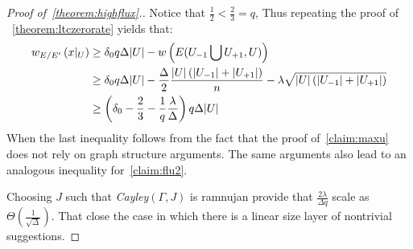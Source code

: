 \begin{proof}[Proof of~\cref{theorem:highflux}.] 
  Notice that $\frac{1}{2} < \frac{2}{3} = q$, Thus repeating the proof of ~\cref{theorem:ltczerorate} yields that:
  \begin{equation*}
    \begin{split}
      w_{E/E^{\prime}}  \left( x|_{U} \right)  & \ge  \delta_{0}q\Delta|U|  - w\left( E(U_{-1} \bigcup U_{+1} ,U) \right)  \\ 
      & \ge   \delta_{0}q\Delta|U| - \frac{\Delta}{2} \frac{|U|\left( |U_{-1}| + |U_{+1}| \right)}{n} -\lambda\sqrt{|U|\left( |U_{-1}| + |U_{+1}| \right)} \\ 
      & \ge  \left( \delta_{0} - \frac{2}{3} - \frac{1}{q}\frac{\lambda}{\Delta} \right)q\Delta |U|
    \end{split}
  \end{equation*}
When the last inequality follows from the fact that the proof of~\cref{claim:maxu} does not rely on graph structure arguments. The same arguments also lead to an analogous inequality for~\cref{claim:flu2}.

  Choosing $J$ such that \emph{Cayley}$\left( \Gamma, J \right)$ is ramnujan provide that $ \frac{2\lambda}{\Delta q}$ scale as $\Theta\left( \frac{1}{\sqrt{\Delta}} \right)$. That close the case in which there is a linear size layer of nontrivial suggestions. 
\end{proof}



